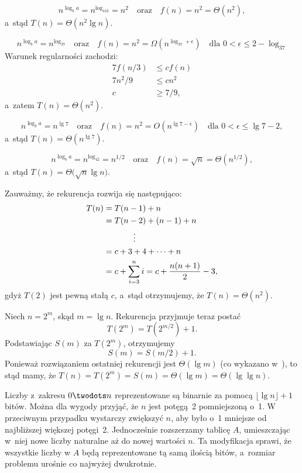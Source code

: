 \subproblem %
\[
	n^{\log_ba} = n^{\log_416} = n^2 \quad\text{oraz}\quad f(n) = n^2 = \Theta(n^2),
\]
a~stąd $T(n)=\Theta(n^2\lg n)$.

\subproblem %
\[
	n^{\log_ba} = n^{\log_37} \quad\text{oraz}\quad f(n) = n^2 = \Omega(n^{\log_37+\epsilon}) \quad\text{dla $0<\epsilon\le2-\log_37$}
\]
Warunek regularności zachodzi:
\begin{align*}
	7f(n/3) &\le cf(n) \\
	7n^2\!/9 &\le cn^2 \\
	c &\ge 7/9,
\end{align*}
a~zatem $T(n)=\Theta(n^2)$.

\subproblem %
\[
	n^{\log_ba} = n^{\lg7} \quad\text{oraz}\quad f(n) = n^2 = O(n^{\lg7-\epsilon}) \quad\text{dla $0<\epsilon\le\lg7-2$},
\]
a~stąd $T(n)=\Theta(n^{\lg7})$.

\subproblem %
\[
	n^{\log_ba} = n^{\log_42} = n^{1/2} \quad\text{oraz}\quad f(n) = \sqrt{n} = \Theta(n^{1/2}),
\]
a~stąd $T(n)=\Theta\bigl(\!\sqrt{n}\lg n\bigr)$.

\subproblem %
Zauważmy, że rekurencja rozwija się następująco:
\begin{align*}
	T(n) &= T(n-1)+n \\
	&= T(n-2)+(n-1)+n \\
	&\hspace{.5in}\vdots \\
	&= c+3+4+\cdots+n \\
	&= c+\sum_{i=3}^ni = c+\frac{n(n+1)}{2}-3,
\end{align*}
gdyż $T(2)$ jest pewną stałą $c$, a~stąd otrzymujemy, że $T(n)=\Theta(n^2)$.

\subproblem %
Niech $n=2^m$, skąd $m=\lg n$. Rekurencja przyjmuje teraz postać
\[
	T(2^m) = T(2^{m/2})+1.
\]
Podstawiając $S(m)$ za $T(2^m)$, otrzymujemy
\[
	S(m) = S(m/2)+1.
\]
Ponieważ rozwiązaniem ostatniej rekurencji jest $\Theta(\lg m)$ (co wykazano w~), to stąd mamy, że $T(n)=T(2^m)=S(m)=\Theta(\lg m)=\Theta(\lg\lg n)$.

Liczby z~zakresu $0\twodots n$ reprezentowane są binarnie za pomocą $\lfloor\lg n\rfloor+1$ bitów. Można dla wygody przyjąć, że $n$ jest potęgą~2 pomniejszoną o~1. W przeciwnym przypadku wystarczy zwiększyć $n$, aby było o~1 mniejsze od najbliższej większej potęgi~2. Jednocześnie rozszerzamy tablicę $A$, umieszczając w~niej nowe liczby naturalne aż do nowej wartości $n$. Ta modyfikacja sprawi, że wszystkie liczby w $A$ będą reprezentowane tą samą ilością bitów, a~rozmiar problemu urośnie co najwyżej dwukrotnie.

